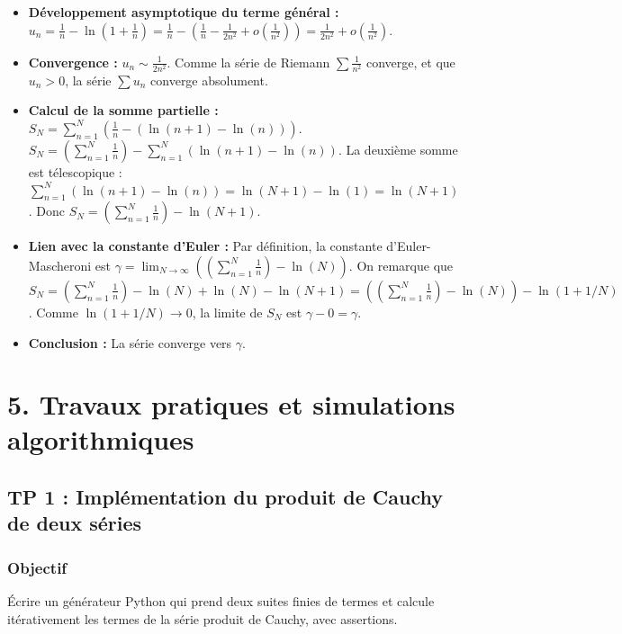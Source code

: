 \documentclass[12pt,a4paper]{report}
\begin{document}
\begin{itemize}
\item \textbf{Développement asymptotique du terme général :}
   $u_n = \frac{1}{n} - \ln(1+\frac{1}{n}) = \frac{1}{n} - (\frac{1}{n} - \frac{1}{2n^2} + o(\frac{1}{n^2})) = \frac{1}{2n^2} + o(\frac{1}{n^2})$.
\item \textbf{Convergence :}
   $u_n \sim \frac{1}{2n^2}$. Comme la série de Riemann $\sum \frac{1}{n^2}$ converge, et que $u_n > 0$, la série $\sum u_n$ converge absolument.
\item \textbf{Calcul de la somme partielle :}
   $S_N = \sum_{n=1}^N (\frac{1}{n} - (\ln(n+1) - \ln(n)))$.
   $S_N = (\sum_{n=1}^N \frac{1}{n}) - \sum_{n=1}^N (\ln(n+1) - \ln(n))$.
   La deuxième somme est télescopique : $\sum_{n=1}^N (\ln(n+1) - \ln(n)) = \ln(N+1) - \ln(1) = \ln(N+1)$.
   Donc $S_N = (\sum_{n=1}^N \frac{1}{n}) - \ln(N+1)$.
\item \textbf{Lien avec la constante d'Euler :}
   Par définition, la constante d'Euler-Mascheroni est $\gamma = \lim_{N\to\infty} ((\sum_{n=1}^N \frac{1}{n}) - \ln(N))$.
   On remarque que $S_N = (\sum_{n=1}^N \frac{1}{n}) - \ln(N) + \ln(N) - \ln(N+1) = ((\sum_{n=1}^N \frac{1}{n}) - \ln(N)) - \ln(1 + 1/N)$.
   Comme $\ln(1+1/N) \to 0$, la limite de $S_N$ est $\gamma - 0 = \gamma$.
\item \textbf{Conclusion :} La série converge vers $\gamma$.
\end{itemize}



\section{5. Travaux pratiques et simulations algorithmiques}


\subsection{TP 1 : Implémentation du produit de Cauchy de deux séries}

\subsubsection{Objectif}

Écrire un générateur Python qui prend deux suites finies de termes et calcule itérativement les termes de la série produit de Cauchy, avec assertions.
\end{document}
